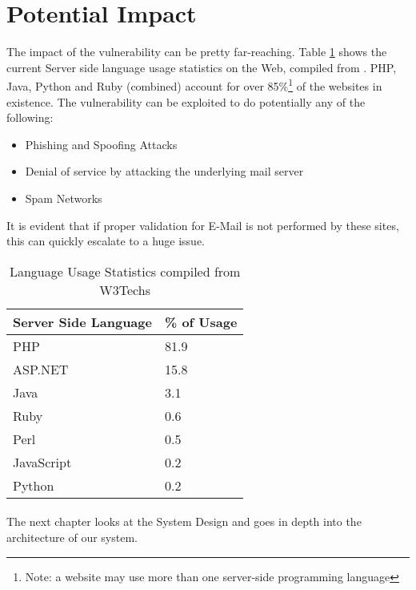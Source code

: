 \section{Potential Impact}

The impact of the vulnerability can be pretty far-reaching.
Table \ref{tab:usage} shows the current Server side language usage statistics on the Web, compiled from \cite{W3techs}. 
PHP, Java, Python and Ruby (combined) account for over 85\%\footnote{Note: a website may use more than one server-side programming language} of the websites in existence. The vulnerability can be exploited to do potentially any of the following:
\begin{itemize}
	\item Phishing and Spoofing Attacks
	\item Denial of service by attacking the underlying mail server
	\item Spam Networks
\end{itemize}

It is evident that if proper validation for E-Mail is not performed by these sites, this can quickly escalate to a huge issue.


\begin{table}[!htbp]
	\centering
	\begin{tabular}{|p{4cm}|p{4cm}|}
		\hline
		\multicolumn{1}{|c|}{\textbf{Server Side Language}} & \multicolumn{1}{c|}{\textbf{\% of Usage}}\\
		\hline
		PHP & 81.9\\
		\hline    
		ASP.NET    & 15.8\\
		\hline
		Java & 3.1\\
		\hline
		Ruby &     0.6\\
		\hline
		Perl &    0.5\\
		\hline
		JavaScript & 0.2\\
		\hline
		Python & 0.2\\
		\hline
		
	\end{tabular}
	\caption{Language Usage Statistics compiled from W3Techs}
	\label{tab:usage}
\end{table}

\paragraph{}
The next chapter looks at the System Design and goes in depth into the architecture of our system.
